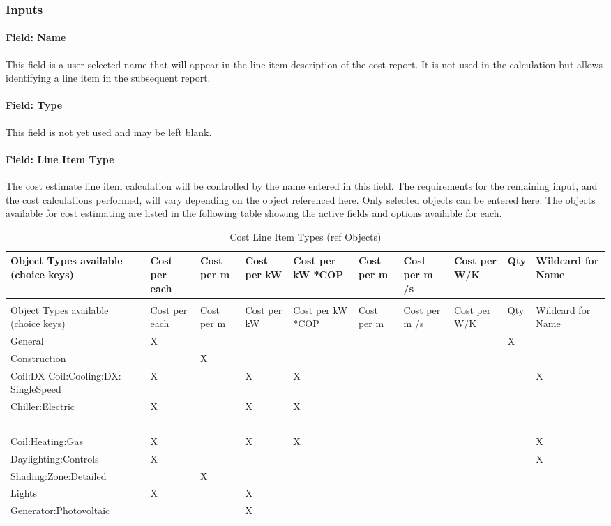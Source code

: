 \subsubsection{Inputs}\label{inputs}

\paragraph{Field: Name}\label{field-name}

This field is a user-selected name that will appear in the line item description of the cost report. It is not used in the calculation but allows identifying a line item in the subsequent report.

\paragraph{Field: Type}\label{field-type}

This field is not yet used and may be left blank.

\paragraph{Field: Line Item Type}\label{field-line-item-type}

The cost estimate line item calculation will be controlled by the name entered in this field. The requirements for the remaining input, and the cost calculations performed, will vary depending on the object referenced here. Only selected objects can be entered here. The objects available for cost estimating are listed in the following table showing the active fields and options available for each.

\begin{longtable}[c]{p{0.6in}p{0.6in}p{0.6in}p{0.6in}p{0.6in}p{0.6in}p{0.6in}p{0.6in}p{0.6in}p{0.6in}}
\caption{Cost Line Item Types (ref Objects) \label{table:cost-line-item-types-ref-objects}} \tabularnewline
\toprule 
Object Types available (choice keys) & Cost per each & Cost per m & Cost per kW & Cost per kW *COP & Cost per m & Cost per m  /s & Cost per W/K & Qty & Wildcard for Name \tabularnewline
\midrule
\endfirsthead

\caption[]{Cost Line Item Types (ref Objects)} \tabularnewline
\toprule 
Object Types available (choice keys) & Cost per each & Cost per m & Cost per kW & Cost per kW *COP & Cost per m & Cost per m  /s & Cost per W/K & Qty & Wildcard for Name \tabularnewline
\midrule
\endhead

General & X & ~ & ~ & ~ & ~ & ~ & ~ & X & ~ \tabularnewline
Construction & ~ & X & ~ & ~ & ~ & ~ & ~ & ~ & ~ \tabularnewline
Coil:DX Coil:Cooling:DX: SingleSpeed & X & ~ & X & X & ~ & ~ & ~ & ~ & X \tabularnewline
Chiller:Electric & X & ~ & X & X & ~ & ~ & ~ & ~ & ~ \tabularnewline
~ & ~ & ~ & ~ & ~ & ~ & ~ & ~ & ~ & ~ \tabularnewline
Coil:Heating:Gas & X & ~ & X & X & ~ & ~ & ~ & ~ & X \tabularnewline
Daylighting:Controls & X & ~ & ~ & ~ & ~ & ~ & ~ & ~ & X \tabularnewline
Shading:Zone:Detailed & ~ & X & ~ & ~ & ~ & ~ & ~ & ~ & ~ \tabularnewline
Lights & X & ~ & X & ~ & ~ & ~ & ~ & ~ & ~ \tabularnewline
Generator:Photovoltaic & ~ & ~ & X & ~ & ~ & ~ & ~ & ~ & ~ \tabularnewline
\bottomrule
\end{longtable}

